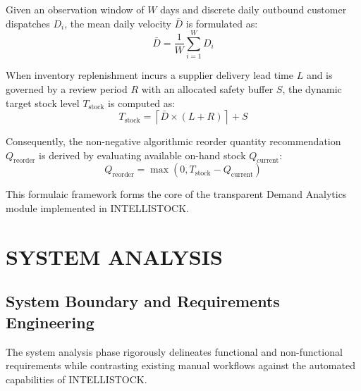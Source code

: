 \documentclass[BTech]{srmuthesis}
\begin{document}
Given an observation window of $W$ days and discrete daily outbound customer dispatches $D_i$, the mean daily velocity $\bar{D}$ is formulated as:
\begin{equation}
\bar{D} = \frac{1}{W} \sum_{i=1}^{W} D_i
\label{eq:sma_velocity}
\end{equation}

When inventory replenishment incurs a supplier delivery lead time $L$ and is governed by a review period $R$ with an allocated safety buffer $S$, the dynamic target stock level $T_{\text{stock}}$ is computed as:
\begin{equation}
T_{\text{stock}} = \left\lceil \bar{D} \times (L + R) \right\rceil + S
\label{eq:target_stock}
\end{equation}

Consequently, the non-negative algorithmic reorder quantity recommendation $Q_{\text{reorder}}$ is derived by evaluating available on-hand stock $Q_{\text{current}}$:
\begin{equation}
Q_{\text{reorder}} = \max\left(0, T_{\text{stock}} - Q_{\text{current}}\right)
\label{eq:reorder_calc}
\end{equation}

This formulaic framework forms the core of the transparent Demand Analytics module implemented in INTELLISTOCK.

\chapter{SYSTEM ANALYSIS}
\label{chap:sys_analysis}

\section{System Boundary and Requirements Engineering}
The system analysis phase rigorously delineates functional and non-functional requirements while contrasting existing manual workflows against the automated capabilities of INTELLISTOCK.
\end{document}
